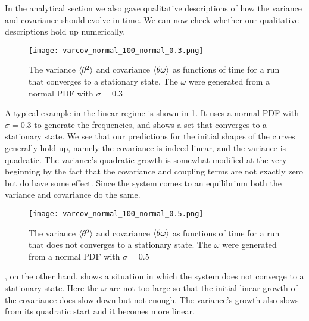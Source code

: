 \documentclass[10pt,a4paper,twocolumn]{article}
\begin{document}



In the analytical section we also gave qualitative descriptions of how the variance and covariance should evolve in time. We can now check whether our qualitative descriptions hold up numerically.

\begin{figure}[!h]
    \centering
    \texttt{[image: varcov\_normal\_100\_normal\_0.3.png]}
    \caption{The variance $\braket{\theta^2}$ and covariance $\braket{\theta \omega}$ as functions of time for a run that converges to a stationary state. The $\omega$ were generated from a normal PDF with $\sigma = 0.3$}
    \label{fig:varcov_100_normal_0.3}
\end{figure}

A typical example in the linear regime is shown in \cref{fig:varcov_100_normal_0.3}. It uses a normal PDF with $\sigma = 0.3$ to generate the frequencies, and shows a set that converges to a stationary state. We see that our predictions for the initial shapes of the curves generally hold up, namely the covariance is indeed linear, and the variance is quadratic. The variance's quadratic growth is somewhat modified at the very beginning by the fact that the covariance and coupling terms are not exactly zero but do have some effect. Since the system comes to an equilibrium both the variance and covariance do the same.

\begin{figure}[!h]
    \centering
    \texttt{[image: varcov\_normal\_100\_normal\_0.5.png]}
    \caption{The variance $\braket{\theta^2}$ and covariance $\braket{\theta \omega}$ as functions of time for a run that does not converges to a stationary state. The $\omega$ were generated from a normal PDF with $\sigma = 0.5$}
    \label{fig:varcov_100_normal_0.5}
\end{figure}

, on the other hand, shows a situation in which the system does not converge to a stationary state. Here the $\omega$ are not too large so that the initial linear growth of the covariance does slow down but not enough. The variance's growth also slows from its quadratic start and it becomes more linear.
\end{document}
